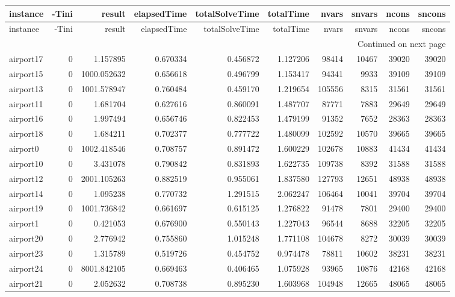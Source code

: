 \documentclass[../../../thesis.tex]{subfiles}
\begin{document}
\tiny
\begin{longtable}{|l|r|r|r|r|r|r|r|r|r|}
\toprule
instance & -Tini & result & elapsedTime & totalSolveTime & totalTime & nvars & snvars & ncons & sncons \\
\midrule
\endfirsthead
\toprule
instance & -Tini & result & elapsedTime & totalSolveTime & totalTime & nvars & snvars & ncons & sncons \\
\midrule
\endhead
\midrule
\multicolumn{10}{r}{Continued on next page} \\
\midrule
\endfoot
\bottomrule
\endlastfoot
airport17 & 0 & 1.157895 & 0.670334 & 0.456872 & 1.127206 & 98414 & 10467 & 39020 & 39020 \\
airport15 & 0 & 1000.052632 & 0.656618 & 0.496799 & 1.153417 & 94341 & 9933 & 39109 & 39109 \\
airport13 & 0 & 1001.578947 & 0.760484 & 0.459170 & 1.219654 & 105556 & 8315 & 31561 & 31561 \\
airport11 & 0 & 1.681704 & 0.627616 & 0.860091 & 1.487707 & 87771 & 7883 & 29649 & 29649 \\
airport16 & 0 & 1.997494 & 0.656746 & 0.822453 & 1.479199 & 91352 & 7652 & 28363 & 28363 \\
airport18 & 0 & 1.684211 & 0.702377 & 0.777722 & 1.480099 & 102592 & 10570 & 39665 & 39665 \\
airport0 & 0 & 1002.418546 & 0.708757 & 0.891472 & 1.600229 & 102678 & 10883 & 41434 & 41434 \\
airport10 & 0 & 3.431078 & 0.790842 & 0.831893 & 1.622735 & 109738 & 8392 & 31588 & 31588 \\
airport12 & 0 & 2001.105263 & 0.882519 & 0.955061 & 1.837580 & 127793 & 12651 & 48938 & 48938 \\
airport14 & 0 & 1.095238 & 0.770732 & 1.291515 & 2.062247 & 106464 & 10041 & 39704 & 39704 \\
airport19 & 0 & 1001.736842 & 0.661697 & 0.615125 & 1.276822 & 91478 & 7801 & 29400 & 29400 \\
airport1 & 0 & 0.421053 & 0.676900 & 0.550143 & 1.227043 & 96544 & 8688 & 32205 & 32205 \\
airport20 & 0 & 2.776942 & 0.755860 & 1.015248 & 1.771108 & 104678 & 8272 & 30039 & 30039 \\
airport23 & 0 & 1.315789 & 0.519726 & 0.454752 & 0.974478 & 78811 & 10602 & 38231 & 38231 \\
airport24 & 0 & 8001.842105 & 0.669463 & 0.406465 & 1.075928 & 93965 & 10876 & 42168 & 42168 \\
airport21 & 0 & 2.052632 & 0.708738 & 0.895230 & 1.603968 & 104948 & 12665 & 48065 & 48065 \\

\end{longtable}
\end{document}
